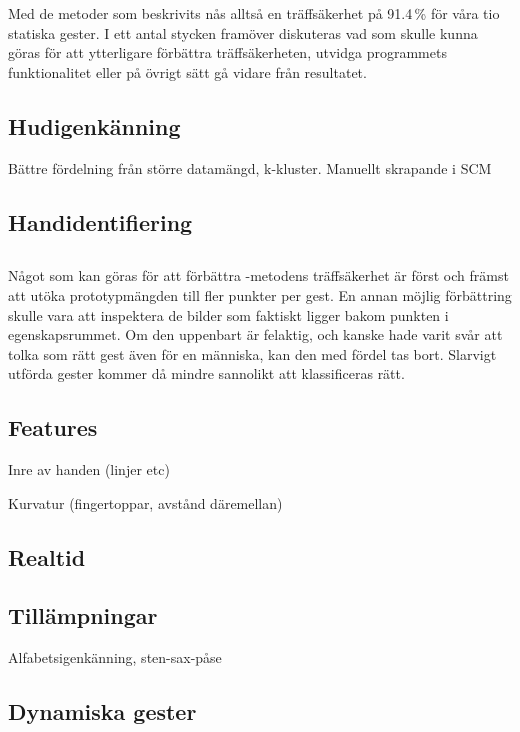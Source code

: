 \documentclass[../rapport_MVEX01-11-05]{subfiles}
\begin{document}
Med de metoder som beskrivits nås alltså en träffsäkerhet på 91.4\,\%
för våra tio statiska gester. I ett antal stycken framöver diskuteras
vad som skulle kunna göras för att ytterligare förbättra
träffsäkerheten, utvidga programmets funktionalitet eller på övrigt
sätt gå vidare från resultatet.

\subsection{Hudigenkänning}
Bättre fördelning från större datamängd, k-kluster.
Manuellt skrapande i SCM
\subsection{Handidentifiering}
\subsection{\knn}
Något som kan göras för att förbättra \knn-metodens träffsäkerhet är först och
främst att utöka prototypmängden till fler punkter per gest. En annan möjlig
förbättring skulle vara att inspektera de bilder som faktiskt ligger bakom
punkten i egenskapsrummet. Om den uppenbart är felaktig, och kanske hade varit
svår att tolka som rätt gest även för en människa, kan den med fördel tas bort.
Slarvigt utförda gester kommer då mindre sannolikt att
klassificeras rätt.
\subsection{Features}
Inre av handen (linjer etc)

Kurvatur (fingertoppar, avstånd däremellan)

\subsection{Realtid}
\subsection{Tillämpningar}
Alfabetsigenkänning, sten-sax-påse

\subsection{Dynamiska gester}
\end{document}
